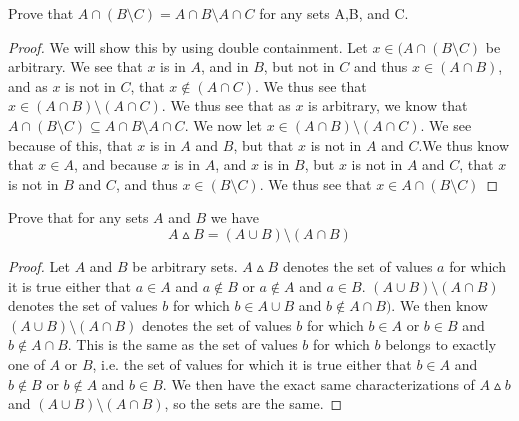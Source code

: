             \begin{minorEx}%
            Prove that $A\cap (B \setminus C) =A\cap B \setminus A\cap C$ for any sets A,B, and C.
             \end{minorEx}
   	\begin{proof}
            We will show this by using double containment. 
            Let $x\in (A \cap (B \setminus C )$ be arbitrary. 
            We see that $x$ is in $A$, and in $B$, but not in $C$ and thus $x \in (A \cap B)$, and as $x$ is not in $C$, that $x\notin (A\cap C)$. We thus see that $x \in (A \cap B) \setminus (A \cap C)$.
            We thus see that as $x$ is arbitrary, we know that $A\cap (B \setminus C) \subseteq A\cap B \setminus A\cap C$.
            We now let $x \in (A \cap B) \setminus (A \cap C)$. 
            We see because of this, that $x$ is in $A$ and $B$, but that $x$ is not in $A$ and $C$.We thus know that $x \in A$, and because $x$ is in $A$, and $x$ is in $B$, but $x$ is not in $A$ and $C$, that $x$ is not in $B$ and $C$, and thus $x\in (B\setminus C)$. We thus see that $x \in A \cap (B \setminus C)$
            
	\end{proof}
    
    \begin{minorEx}%
    Prove that for any sets $A$ and $B$ we have $$A \vartriangle B = (A \cup B) \setminus (A \cap B)$$
    \begin{proof}
    Let $A$ and $B$ be arbitrary sets. $A \vartriangle B$ denotes the set of values $a$ for which it is true either that $a \in A$ and $a \not \in B$ or $a \not \in A$ and $a \in B$. $(A \cup B) \setminus (A \cap B)$ denotes the set of values $b$ for which $b \in A \cup B$ and $b \not \in A \cap B)$. We then know $(A \cup B) \setminus (A \cap B)$ denotes the set of values $b$ for which $b \in A$ or $b \in B$ and $b \not \in A \cap B$. This is the same as the set of values $b$ for which $b$ belongs to exactly one of $A$ or $B$, i.e. the set of values for which it is true either that $b \in A$ and $b \not \in B$ or $b \not \in A$ and $b \in B$. We then have the exact same characterizations of $A \vartriangle b$ and $(A \cup B) \setminus (A \cap B)$, so the sets are the same.
    \end{proof}
    \end{minorEx}
    
